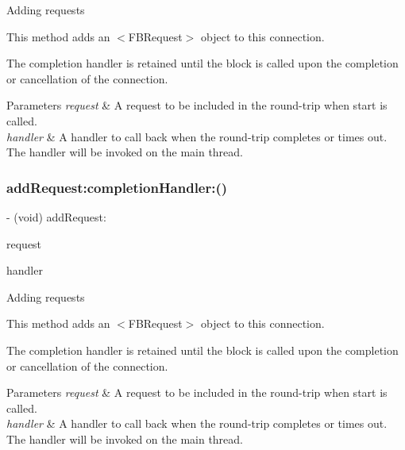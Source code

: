 Adding requests

This method adds an $<$\+F\+B\+Request$>$ object to this connection.

The completion handler is retained until the block is called upon the completion or cancellation of the connection.


\begin{DoxyParams}{Parameters}
{\em request} & A request to be included in the round-\/trip when start is called. \\
\hline
{\em handler} & A handler to call back when the round-\/trip completes or times out. The handler will be invoked on the main thread. \\
\hline
\end{DoxyParams}
\mbox{\label{interfaceFBRequestConnection_a751b0603d2cc22be745f33a112681e0d}} 
\subsubsection{\texorpdfstring{add\+Request\+:completion\+Handler\+:()}{addRequest:completionHandler:()}\hspace{0.1cm}{\footnotesize\ttfamily [2/5]}}
{\footnotesize\ttfamily -\/ (void) add\+Request\+: \begin{DoxyParamCaption}\item[{(\hyperlink{interfaceFBRequest}{F\+B\+Request} $\ast$)}]{request }\item[{completionHandler:(F\+B\+Request\+Handler)}]{handler }\end{DoxyParamCaption}}

Adding requests

This method adds an $<$\+F\+B\+Request$>$ object to this connection.

The completion handler is retained until the block is called upon the completion or cancellation of the connection.


\begin{DoxyParams}{Parameters}
{\em request} & A request to be included in the round-\/trip when start is called. \\
\hline
{\em handler} & A handler to call back when the round-\/trip completes or times out. The handler will be invoked on the main thread. \\
\hline
\end{DoxyParams}
\mbox{\label{interfaceFBRequestConnection_a751b0603d2cc22be745f33a112681e0d}} 
